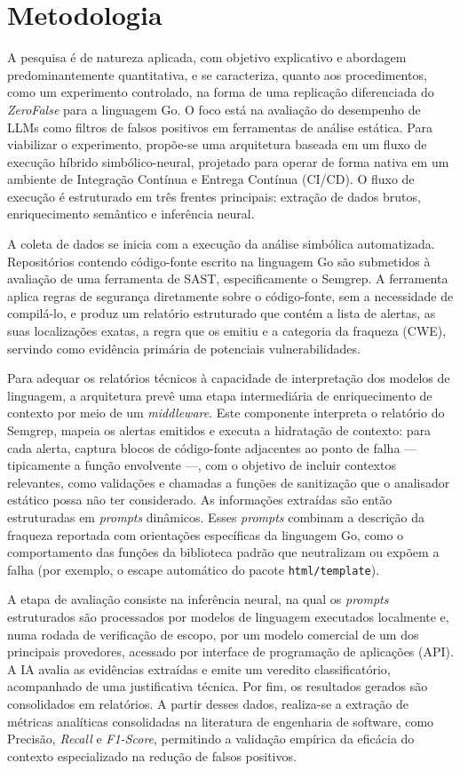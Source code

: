 \section{Metodologia}
A pesquisa é de natureza aplicada, com objetivo explicativo e abordagem predominantemente quantitativa, e se caracteriza, quanto aos procedimentos, como um experimento controlado, na forma de uma replicação diferenciada do \textit{ZeroFalse} \cite{iranmanesh2025zerofalseimprovingprecisionstatic} para a linguagem Go. O foco está na avaliação do desempenho de LLMs como filtros de falsos positivos em ferramentas de análise estática. Para viabilizar o experimento, propõe-se uma arquitetura baseada em um fluxo de execução híbrido simbólico-neural, projetado para operar de forma nativa em um ambiente de Integração Contínua e Entrega Contínua (CI/CD). O fluxo de execução é estruturado em três frentes principais: extração de dados brutos, enriquecimento semântico e inferência neural.

A coleta de dados se inicia com a execução da análise simbólica automatizada. Repositórios contendo código-fonte escrito na linguagem Go são submetidos à avaliação de uma ferramenta de SAST, especificamente o Semgrep. A ferramenta aplica regras de segurança diretamente sobre o código-fonte, sem a necessidade de compilá-lo, e produz um relatório estruturado que contém a lista de alertas, as suas localizações exatas, a regra que os emitiu e a categoria da fraqueza (CWE), servindo como evidência primária de potenciais vulnerabilidades.

Para adequar os relatórios técnicos à capacidade de interpretação dos modelos de linguagem, a arquitetura prevê uma etapa intermediária de enriquecimento de contexto por meio de um \textit{middleware}. Este componente interpreta o relatório do Semgrep, mapeia os alertas emitidos e executa a hidratação de contexto: para cada alerta, captura blocos de código-fonte adjacentes ao ponto de falha --- tipicamente a função envolvente ---, com o objetivo de incluir contextos relevantes, como validações e chamadas a funções de sanitização que o analisador estático possa não ter considerado. As informações extraídas são então estruturadas em \textit{prompts} dinâmicos. Esses \textit{prompts} combinam a descrição da fraqueza reportada com orientações específicas da linguagem Go, como o comportamento das funções da biblioteca padrão que neutralizam ou expõem a falha (por exemplo, o escape automático do pacote \texttt{html/template}).

A etapa de avaliação consiste na inferência neural, na qual os \textit{prompts} estruturados são processados por modelos de linguagem executados localmente e, numa rodada de verificação de escopo, por um modelo comercial de um dos principais provedores, acessado por interface de programação de aplicações (API). A IA avalia as evidências extraídas e emite um veredito classificatório, acompanhado de uma justificativa técnica. Por fim, os resultados gerados são consolidados em relatórios. A partir desses dados, realiza-se a extração de métricas analíticas consolidadas na literatura de engenharia de software, como Precisão, \textit{Recall} e \textit{F1-Score}, permitindo a validação empírica da eficácia do contexto especializado na redução de falsos positivos.

